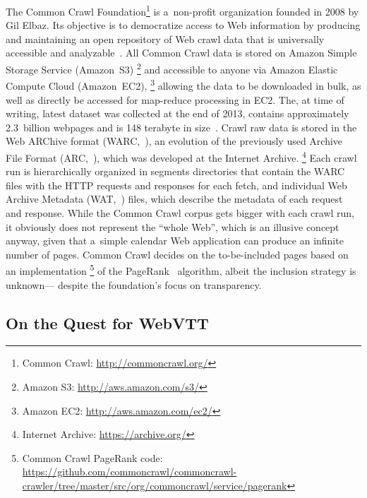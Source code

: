\documentclass{sig-alternate}
\newcommand{\inlinelistingsize}{\fontsize{8pt}{11pt}}
\let\oldurl\url
\renewcommand{\url}[1]{\inlinelistingsize\oldurl{#1}}
\begin{document}
The Common Crawl Foundation\footnote{Common Crawl: \url{http://commoncrawl.org/}}
is a~non-profit organization founded in 2008 by Gil Elbaz.
Its objective is to democratize access to Web information
by producing and maintaining an open repository of Web crawl data
that is universally accessible and analyzable~\cite{simonite2013commoncrawl}.
All Common Crawl data is stored on Amazon Simple Storage Service (Amazon~S3)%
\footnote{Amazon S3: \url{http://aws.amazon.com/s3/}} and
accessible to anyone via Amazon Elastic Compute Cloud (Amazon~EC2),%
\footnote{Amazon EC2: \url{http://aws.amazon.com/ec2/}}
allowing the data to be downloaded in bulk,
as well as directly be accessed for map-reduce processing in EC2.
The, at time of writing, latest dataset was collected at the end of 2013,
contains approximately 2.3~billion webpages
and is 148 terabyte in size~\cite{green2014winter}.
Crawl raw data is stored in the Web ARChive format
(WARC,~\cite{iso285002008warc}), an evolution of the previously used
Archive File Format (ARC,~\cite{burner1996arc}),
which was developed at the Internet Archive.%
\footnote{Internet Archive: \url{https://archive.org/}}
Each crawl run is hierarchically organized in segments directories
that contain the WARC files with the HTTP requests and responses for each fetch,
and individual Web Archive Metadata (WAT,~\cite{goel2011wat}) files,
which describe the metadata of each request and response.
While the Common Crawl corpus gets bigger with each crawl run,
it obviously does not represent the ``whole Web'',
which is an illusive concept anyway,
given that a~simple calendar Web application can produce an infinite number of pages.
Common Crawl decides on the to-be-included pages based on an implementation%
\footnote{Common Crawl PageRank code:
\url{https://github.com/commoncrawl/commoncrawl-crawler/tree/master/src/org/commoncrawl/service/pagerank}}
of the PageRank~\cite{page1999pagerank} algorithm,
albeit the inclusion strategy is unknown---%
despite the foundation's focus on transparency.

\subsection{On the Quest for WebVTT}
\end{document}
